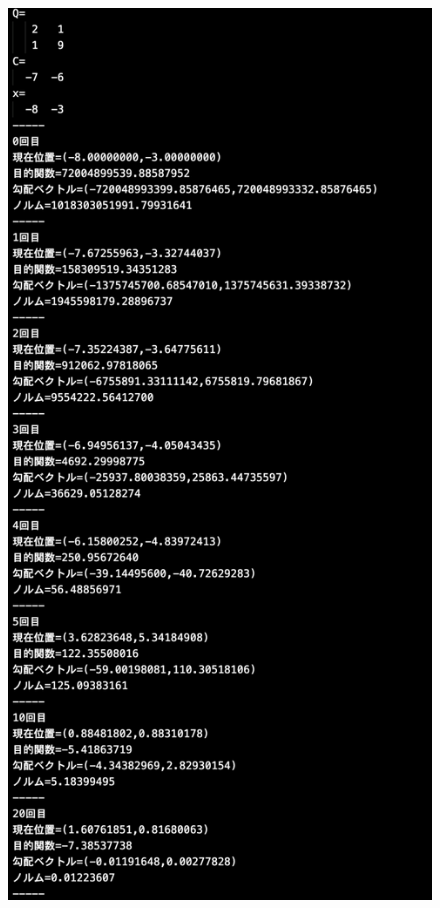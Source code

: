 \documentclass[12pt]{jarticle}
\begin{document}
\clearpage
\begin{figure}[h]
    \begin{center}
        \includegraphics[scale=0.2]{kadai1_1s_out3_1_1.png}
    \end{center}

\end{figure}
\end{document}
